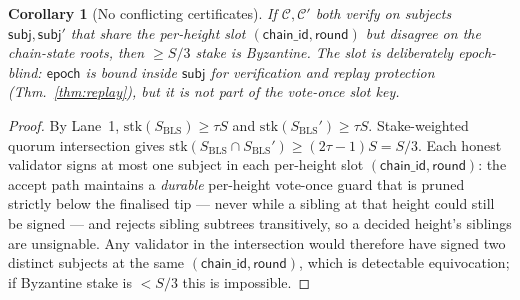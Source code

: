 \documentclass[11pt]{article}
\newtheorem{corollary}[theorem]{Corollary}
\begin{document}
\begin{corollary}[No conflicting certificates]
\label{cor:no-conflict}
If $\mathcal{C}, \mathcal{C}'$ both verify on subjects $\mathsf{subj},
\mathsf{subj}'$ that share the per-height slot $(\mathsf{chain\_id},
\mathsf{round})$ but disagree on the chain-state roots, then
$\geq S/3$ stake is Byzantine.  The slot is deliberately
\emph{epoch-blind}: $\mathsf{epoch}$ is bound inside $\mathsf{subj}$ for
verification and replay protection (Thm.~\ref{thm:replay}), but it is
\emph{not} part of the vote-once slot key.
\end{corollary}

\begin{proof}
By Lane~1, $\mathrm{stk}(S_{\mathrm{BLS}}) \geq \tau S$ and
$\mathrm{stk}(S_{\mathrm{BLS}}') \geq \tau S$.  Stake-weighted quorum
intersection gives
$\mathrm{stk}(S_{\mathrm{BLS}} \cap S_{\mathrm{BLS}}') \geq (2\tau - 1) S
= S/3$.  Each honest validator signs at most one subject in each
per-height slot $(\mathsf{chain\_id}, \mathsf{round})$: the accept path maintains a
\emph{durable} per-height vote-once guard that is pruned strictly below
the finalised tip --- never while a sibling at that height could still
be signed --- and rejects sibling subtrees transitively, so a decided
height's siblings are unsignable.  Any validator in the intersection
would therefore have signed two distinct subjects at the same
$(\mathsf{chain\_id}, \mathsf{round})$, which is detectable
equivocation; if Byzantine stake is $< S/3$ this is impossible.
\end{proof}
\end{document}
